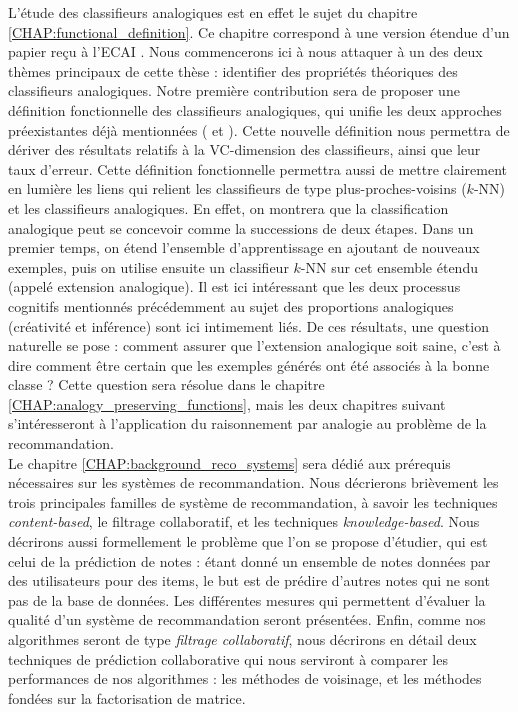 L'étude des classifieurs analogiques est en effet le sujet du chapitre
\ref{CHAP:functional_definition}. Ce chapitre correspond à une version étendue
d'un papier reçu à l'ECAI \cite{HugPraRicSerECAI16}. Nous commencerons ici à
nous attaquer à un des deux thèmes principaux de cette thèse : identifier des
propriétés théoriques des classifieurs analogiques. Notre première contribution
sera de proposer une définition fonctionnelle des classifieurs analogiques, qui
unifie les deux approches préexistantes déjà mentionnées (\cite{StrYvoCNLL05}
et \cite{BayMicDelIJCAI07}). Cette nouvelle définition nous permettra de
dériver des résultats relatifs à la VC-dimension des classifieurs, ainsi que
leur taux d'erreur. Cette définition fonctionnelle permettra aussi de mettre
clairement en lumière les liens qui relient les classifieurs de type
plus-proches-voisins ($k$-NN) et les classifieurs analogiques. En effet, on
montrera que la classification analogique peut se concevoir comme la
successions de deux étapes. Dans un premier temps, on étend l'ensemble
d'apprentissage  en ajoutant de nouveaux exemples, puis on utilise ensuite un
classifieur $k$-NN sur cet ensemble étendu (appelé extension analogique). Il
est ici intéressant que les deux processus cognitifs mentionnés précédemment au
sujet des proportions analogiques (créativité et inférence) sont ici intimement
liés. De ces résultats, une question naturelle se pose : comment assurer que
l'extension analogique soit saine, c'est à dire comment être certain que les
exemples générés ont été associés à la bonne classe ? Cette question sera
résolue dans le chapitre \ref{CHAP:analogy_preserving_functions}, mais les deux
chapitres suivant s'intéresseront à l'application du raisonnement par analogie
au problème de la recommandation.\\


Le chapitre  \ref{CHAP:background_reco_systems} sera dédié aux prérequis
nécessaires sur les systèmes de recommandation. Nous décrierons brièvement les
trois principales familles de système de recommandation, à savoir les
techniques \textit{content-based}, le filtrage collaboratif, et les techniques
\textit{knowledge-based}. Nous décrirons aussi formellement le problème que
l'on se propose d'étudier, qui est celui de la prédiction de notes : étant
donné un ensemble de notes données par des utilisateurs pour des items, le but
est de prédire d'autres notes qui ne sont pas de la base de données. Les
différentes mesures qui permettent d'évaluer la qualité d'un système de
recommandation seront présentées. Enfin, comme nos algorithmes seront de type
\textit{filtrage collaboratif}, nous décrirons en détail deux techniques de
prédiction collaborative qui nous serviront à comparer les performances de nos
algorithmes : les méthodes de voisinage, et les méthodes fondées sur la
factorisation de matrice.\\


